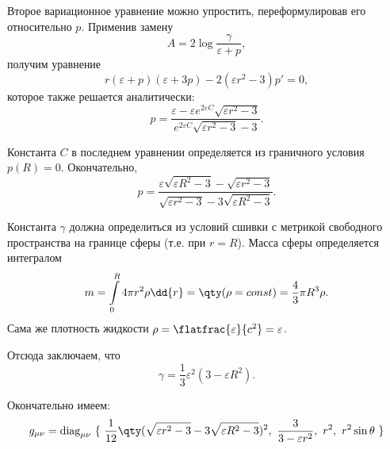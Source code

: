 \documentclass[\docroot/reports/draft/report.tex]{subfiles}
\begin{document}
    Второе вариационное уравнение можно упростить, переформулировав его относительно $p$. Применив замену
    \begin{equation*}
        A = 2 \log{\frac{\gamma}{\varepsilon + p}} ,
    \end{equation*}
    получим уравнение
    \begin{equation*}
        r (\varepsilon + p) (\varepsilon + 3 p) - 2 (\varepsilon r^2 - 3) p' = 0 ,
    \end{equation*}
    которое также решается аналитически:
    \begin{equation*}
        p = \frac{\varepsilon - \varepsilon e^{2 \varepsilon C} \sqrt{\varepsilon r^2 - 3}}{e^{2 \varepsilon C} \sqrt{\varepsilon r^2 - 3} - 3} .
    \end{equation*}

    Константа $C$ в последнем уравнении определяется из граничного условия $p(R) = 0$. Окончательно,
    \begin{equation}
        p = \frac{\varepsilon \sqrt{\varepsilon R^2 - 3} - \sqrt{\varepsilon r^2 - 3}}{
            \sqrt{\varepsilon r^2 - 3} - 3 \sqrt{\varepsilon R^2 - 3}} .
    \end{equation}

    Константа $\gamma$ должна определиться из условий сшивки с метрикой свободного пространства на границе сферы (т.е. при $r = R$). Масса сферы определяется интегралом
    \begin{equation*}
        m = \int\limits_0^R 4 \pi r^2 \rho \dd{r} = \qty( \rho = const ) = \frac{4}{3} \pi R^3 \rho .
    \end{equation*}
    Сама же плотность жидкости $\rho = \flatfrac{\varepsilon}{c^2} = \varepsilon$.

    Отсюда заключаем, что
    \begin{equation}
        \gamma = \frac{1}{3} \varepsilon^2 (3 - \varepsilon R^2) .
    \end{equation}

    Окончательно имеем:
    \begin{equation}
        g_{\mu\nu} = \text{diag}_{\mu\nu}\ \{\
            \frac{1}{12} \qty(\sqrt{\varepsilon r^2 - 3} - 3 \sqrt{\varepsilon R^2 - 3})^2,\
            \frac{3}{3 - \varepsilon r^2},\
            r^2,\
            r^2 \sin\theta
        \ \}
    \end{equation}
\end{document}
